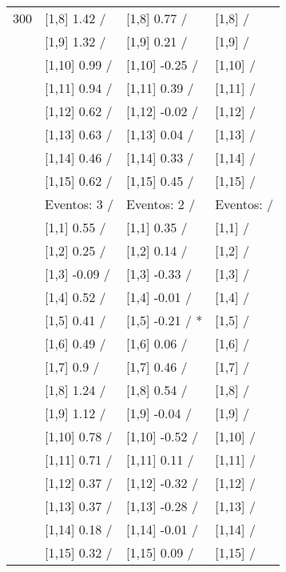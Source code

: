 \begin{table}
\begin{tabular}[t]{llll}
300 & {}[1,8] 1.42  / & {}[1,8] 0.77  / & {}[1,8]  /\\
\addlinespace
 & {}[1,9] 1.32  / & {}[1,9] 0.21  / & {}[1,9]  /\\
 & {}[1,10] 0.99  / & {}[1,10] -0.25  / & {}[1,10]  /\\
 & {}[1,11] 0.94  / & {}[1,11] 0.39  / & {}[1,11]  /\\
 & {}[1,12] 0.62  / & {}[1,12] -0.02  / & {}[1,12]  /\\
 & {}[1,13] 0.63  / & {}[1,13] 0.04  / & {}[1,13]  /\\
\addlinespace
 & {}[1,14] 0.46  / & {}[1,14] 0.33  / & {}[1,14]  /\\
 & {}[1,15] 0.62  / & {}[1,15] 0.45  / & {}[1,15]  /\\
 & Eventos:  3 / & Eventos:  2 / & Eventos:   /\\
 & {}[1,1] 0.55  / & {}[1,1] 0.35  / & {}[1,1]  /\\
 & {}[1,2] 0.25  / & {}[1,2] 0.14  / & {}[1,2]  /\\
\addlinespace
 & {}[1,3] -0.09  / & {}[1,3] -0.33  / & {}[1,3]  /\\
 & {}[1,4] 0.52  / & {}[1,4] -0.01  / & {}[1,4]  /\\
 & {}[1,5] 0.41  / & {}[1,5] -0.21  / * & {}[1,5]  /\\
 & {}[1,6] 0.49  / & {}[1,6] 0.06  / & {}[1,6]  /\\
 & {}[1,7] 0.9  / & {}[1,7] 0.46  / & {}[1,7]  /\\
\addlinespace
500 & {}[1,8] 1.24  / & {}[1,8] 0.54  / & {}[1,8]  /\\
 & {}[1,9] 1.12  / & {}[1,9] -0.04  / & {}[1,9]  /\\
 & {}[1,10] 0.78  / & {}[1,10] -0.52  / & {}[1,10]  /\\
 & {}[1,11] 0.71  / & {}[1,11] 0.11  / & {}[1,11]  /\\
 & {}[1,12] 0.37  / & {}[1,12] -0.32  / & {}[1,12]  /\\
\addlinespace
 & {}[1,13] 0.37  / & {}[1,13] -0.28  / & {}[1,13]  /\\
 & {}[1,14] 0.18  / & {}[1,14] -0.01  / & {}[1,14]  /\\
 & {}[1,15] 0.32  / & {}[1,15] 0.09  / & {}[1,15]  /\\
\bottomrule
\end{tabular}
\end{table}
